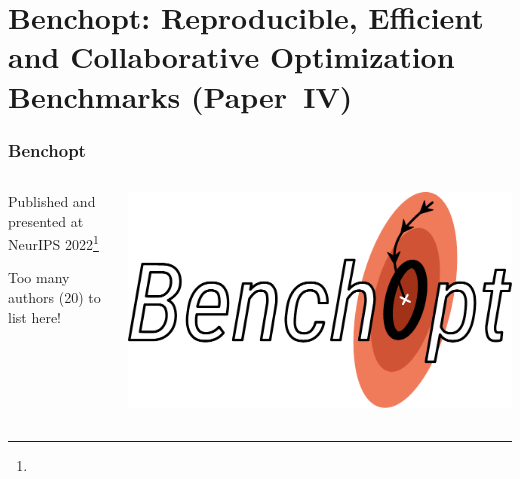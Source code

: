 \documentclass[10pt]{beamer}
\begin{document}
\section{Benchopt: Reproducible, Efficient and Collaborative Optimization Benchmarks (Paper~IV)}

\begin{frame}[c]
  \frametitle{Benchopt}

  \begin{columns}
    \begin{column}{0.45\textwidth}
      Published and presented at NeurIPS 2022\footnote[frame]{}

      \medskip

      Too many authors (20) to list here!
    \end{column}
    \begin{column}{0.45\textwidth}
      \includegraphics[width=\textwidth]{figures/paper4-benchopt_logo.pdf}
    \end{column}
  \end{columns}
\end{frame}
\end{document}
